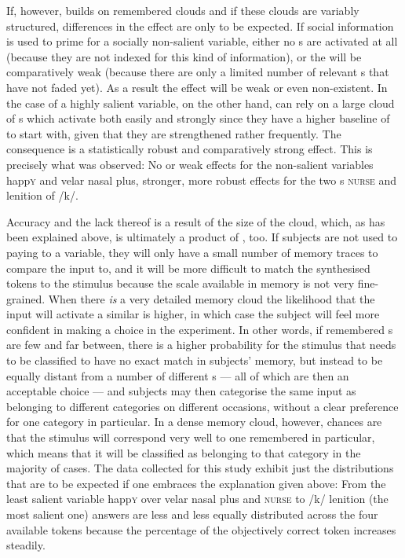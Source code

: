If, however,  builds on remembered  clouds and if these clouds are variably structured, differences in the  effect are only to be expected.
If social information is used to prime for a socially non-salient variable, either no s are activated at all (because they are not indexed for this kind of information), or the  will be comparatively weak (because there are only a limited number of relevant s that have not faded yet).
As a result the  effect will be weak or even non-existent.
In the case of a highly salient variable, on the other hand,  can rely on a large cloud of s which activate both easily and strongly since they have a higher baseline of  to start with, given that they are strengthened rather frequently.
The consequence is a statistically robust and comparatively strong  effect.
This is precisely what was observed: No or weak  effects for the non-salient variables happ\textsc{y} and velar nasal plus, stronger, more robust  effects for the two s \textsc{nurse} and lenition of /k/.

Accuracy and the lack thereof is a result of the size of the  cloud, which, as has been explained above, is ultimately a product of , too.
If subjects are not used to paying  to a variable, they will only have a small number of memory traces to compare the input to, and it will be more difficult to match the synthesised tokens to the stimulus because the scale available in memory is not very fine-grained.
When there \emph{is} a very detailed memory cloud the likelihood that the input will activate a similar  is higher, in which case the subject will feel more confident in making a choice in the experiment.
In other words, if remembered s are few and far between, there is a higher probability for the stimulus that needs to be classified to have no exact match in subjects' memory, but instead to be equally distant from a number of different s --- all of which are then an acceptable choice --- and subjects may then categorise the same input as belonging to different categories on different occasions, without a clear preference for one category in particular.
In a dense memory cloud, however, chances are that the stimulus will correspond very well to one remembered  in particular, which means that it will be classified as belonging to that category in the majority of cases.
The data collected for this study exhibit just the distributions that are to be expected if one embraces the explanation given above: From the least salient variable happ\textsc{y} over velar nasal plus and \textsc{nurse} to /k/ lenition (the most salient one) answers are less and less equally distributed across the four available tokens because the percentage of the objectively correct token increases steadily.


